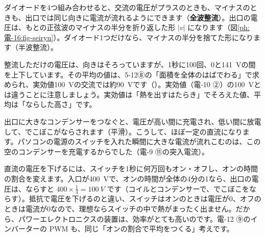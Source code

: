 ダイオードを4つ組み合わせると、交流の電圧がプラスのときも、マイナスのときも、出口では同じ向きに電流が流れるようにできます（\textbf{全波整流}）。出口の電圧は、もとの正弦波のマイナスの半分を折り返した形 $\lvert v\rvert$ になります（図\ref{ph:電-16:fig-seiryu}）。ダイオード1つだけなら、マイナスの半分を捨てた形になります（半波整流）。
\begin{bkfigure}
\label{ph:電-16:fig-seiryu}
\end{bkfigure}
整流しただけの電圧は、向きはそろっていますが、1秒に100回、0と\qty{141}{V}の間を上下しています。その平均の値は、5-12⑧の「面積を全体のはばでわる」で求められ、実効値\qty{100}{V}の交流では約\qty{90}{V}です（）。実効値（電-10 ②）の\qty{100}{V}とは違うことに注意しましょう。実効値は「熱を出すはたらき」でそろえた値、平均は「ならした高さ」です。

出口に大きなコンデンサーをつなぐと、電圧が高い間に充電され、低い間に放電して、でこぼこがならされます（平滑）。こうして、ほぼ一定の直流になります。パソコンの電源のスイッチを入れた瞬間に大きな電流が流れこむのは、この空のコンデンサーを充電するからでした（電-9 ⑪の突入電流）。

直流の電圧を下げるには、スイッチを1秒に何万回もオン・オフし、オンの時間の割合を変えます。入口が\qty{400}{V}で、オンの時間が全体の4分の1なら、出口の電圧は、ならすと $400\times\tfrac14=\qty{100}{V}$ です（コイルとコンデンサーで、でこぼこをならす）。抵抗で電圧を下げるのと違い、スイッチはオンのときは電圧が0、オフのときは電流が0なので、理想ならスイッチの中で熱がまったく出ません。だから、パワーエレクトロニクスの装置は、効率がとても高いのです。電-12 ⑨のインバーターの PWM も、同じ「オンの割合で平均をつくる」考えです。


